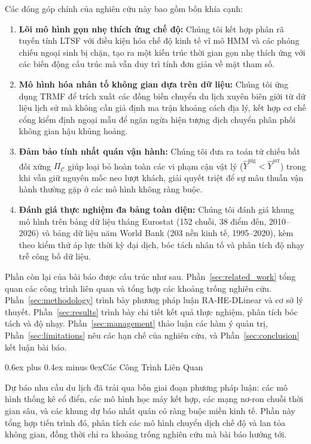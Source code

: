 \documentclass[10pt,journal,compsoc]{IEEEtran}
\makeatletter
\def\section{\@startsection{section}{1}{\z@}{-2.2ex plus -0.8ex minus -0.4ex}%
{0.6ex plus 0.4ex minus 0ex}{\normalfont\sublargesize\rmfamily\bfseries}}
\makeatother
\begin{document}
Các đóng góp chính của nghiên cứu này bao gồm bốn khía cạnh:
\begin{enumerate}
    \item \textbf{Lõi mô hình gọn nhẹ thích ứng chế độ:} Chúng tôi kết hợp phân rã tuyến tính LTSF với điều kiện hóa chế độ kinh tế vĩ mô HMM và các phóng chiếu ngoại sinh bị chặn, tạo ra một kiến trúc thời gian gọn nhẹ thích ứng với các biến động cấu trúc mà vẫn duy trì tính đơn giản về mặt tham số.
    \item \textbf{Mô hình hóa nhân tố không gian dựa trên dữ liệu:} Chúng tôi ứng dụng TRMF để trích xuất các đồng biến chuyển du lịch xuyên biên giới từ dữ liệu lịch sử mà không cần giả định ma trận khoảng cách địa lý, kết hợp cơ chế cổng kiểm định ngoại mẫu để ngăn ngừa hiện tượng dịch chuyển phân phối không gian hậu khủng hoảng.
    \item \textbf{Đảm bảo tính nhất quán vận hành:} Chúng tôi đưa ra toán tử chiếu bất đối xứng $\Pi_{\mathcal{C}}$ giúp loại bỏ hoàn toàn các vi phạm cận vật lý ($\hat{Y}^{\text{nig}} < \hat{Y}^{\text{arr}}$) trong khi vẫn giữ nguyên mốc neo lượt khách, giải quyết triệt để sự mâu thuẫn vận hành thường gặp ở các mô hình không ràng buộc.
    \item \textbf{Đánh giá thực nghiệm đa bảng toàn diện:} Chúng tôi đánh giá khung mô hình trên bảng dữ liệu tháng Eurostat (152 chuỗi, 38 điểm đến, 2010--2026) và bảng dữ liệu năm World Bank (203 nền kinh tế, 1995--2020), kèm theo kiểm thử áp lực thời kỳ đại dịch, bóc tách nhân tố và phân tích độ nhạy trễ công bố dữ liệu.
\end{enumerate}

Phần còn lại của bài báo được cấu trúc như sau. Phần~\ref{sec:related_work} tổng quan các công trình liên quan và tổng hợp các khoảng trống nghiên cứu. Phần~\ref{sec:methodology} trình bày phương pháp luận RA-HE-DLinear và cơ sở lý thuyết. Phần~\ref{sec:results} trình bày chi tiết kết quả thực nghiệm, phân tích bóc tách và độ nhạy. Phần~\ref{sec:management} thảo luận các hàm ý quản trị, Phần~\ref{sec:limitations} nêu các hạn chế của nghiên cứu, và Phần~\ref{sec:conclusion} kết luận bài báo.

\section{\texorpdfstring{Các Công Trình Liên Quan}{Cac Cong Trinh Lien Quan}}
\label{sec:related_work}

Dự báo nhu cầu du lịch đã trải qua bốn giai đoạn phương pháp luận: các mô hình thống kê cổ điển, các mô hình học máy kết hợp, các mạng nơ-ron chuỗi thời gian sâu, và các khung dự báo nhất quán có ràng buộc miền kinh tế. Phần này tổng hợp tiến trình đó, phân tích các mô hình chuyển dịch chế độ và lan tỏa không gian, đồng thời chỉ ra khoảng trống nghiên cứu mà bài báo hướng tới.
\end{document}
